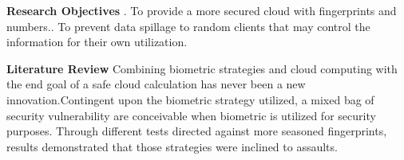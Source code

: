 \documentclass[12pt]{article}
\begin{document}
\textbf{\large Research Objectives} \newline {}.  To provide a more secured cloud with fingerprints and numbers.\newline {}.  To prevent data spillage to random clients that may control the information for their own utilization. \newline \newline

\textbf{\large Literature Review} \newline \newline
Combining biometric strategies and cloud computing with the end goal of a safe cloud calculation has never been a new innovation.Contingent upon the biometric strategy utilized, a mixed bag of security vulnerability are conceivable when biometric is utilized for security purposes. Through different tests directed against more seasoned fingerprints, results demonstrated that those strategies were inclined to assaults. \newpage
\end{document}
